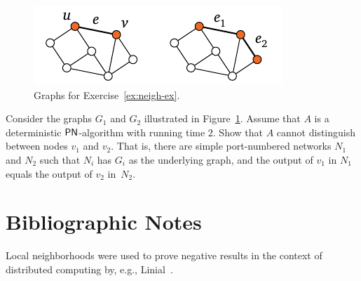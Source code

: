 \begin{figure}
    \centering
    \includegraphics[page=\PNeighEx]{figs.pdf}
    \caption{Graphs for Exercise~\ref{ex:neigh-ex}.}\label{fig:neigh-ex}
\end{figure}

\begin{exs}\label{ex:neigh-ex}
    Consider the graphs $G_1$ and $G_2$ illustrated in Figure~\ref{fig:neigh-ex}. Assume that $A$ is a deterministic $\textup{\sffamily PN}$-algorithm with running time $2$. Show that $A$ cannot distinguish between nodes $v_1$ and $v_2$. That is, there are simple port-numbered networks $N_1$ and $N_2$ such that $N_i$ has $G_i$ as the underlying graph, and the output of $v_1$ in $N_1$ equals the output of $v_2$ in~$N_2$.

\end{exs}


\section{Bibliographic Notes}

Local neighborhoods were used to prove negative results in the context of distributed computing by, e.g., Linial~\cite{linial92locality}.
